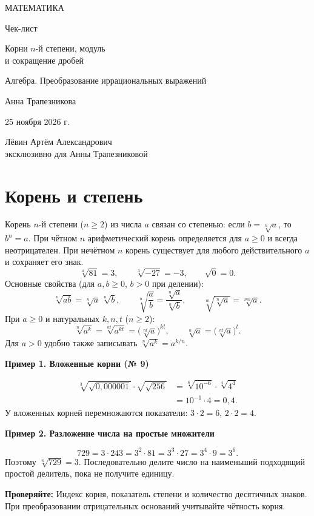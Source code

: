 \documentclass[a4paper,12pt]{article}
\newcommand{\example}[1]{\par\medskip\textcolor{darkaccent}{\textbf{#1}}\par}
\newcommand{\remember}[1]{\par\smallskip\textcolor{darkaccent}{\textbf{Проверяйте:}} #1\par}
\begin{document}
\begin{titlepage}
\centering
\vspace*{23mm}
{\Large\color{darkaccent} МАТЕМАТИКА\par}
\vspace{15mm}
{\huge Чек-лист\par}
\vspace{9mm}
{\LARGE\color{accent} Корни $n$-й степени, модуль\\[2mm] и сокращение дробей\par}
\vspace{13mm}
{\large Алгебра. Преобразование иррациональных выражений\par}
\vfill
{\large Анна Трапезникова\par}
\vspace{9mm}
{25 ноября 2026 г.\par}
\vspace{15mm}
{\small Лёвин Артём Александрович\\ эксклюзивно для Анны Трапезниковой\par}
\vspace{19mm}
\end{titlepage}
\setcounter{page}{1}
\section{Корень и степень}
Корень $n$-й степени ($n\ge2$) из числа $a$ связан со степенью: если $b=\sqrt[n]{a}$, то $b^n=a$. При чётном $n$ арифметический корень определяется для $a\ge0$ и всегда неотрицателен. При нечётном $n$ корень существует для любого действительного $a$ и сохраняет его знак.
\[
\sqrt[4]{81}=3,\qquad \sqrt[3]{-27}=-3,\qquad \sqrt{0}=0.
\]
\textcolor{darkaccent}{Основные свойства} (для $a,b\ge0$, $b>0$ при делении):
\[
\sqrt[n]{ab}=\sqrt[n]{a}\,\sqrt[n]{b},\qquad
\sqrt[n]{\frac ab}=\frac{\sqrt[n]{a}}{\sqrt[n]{b}},
\qquad \sqrt[m]{\sqrt[n]{a}}=\sqrt[mn]{a}.
\]
При $a\ge0$ и натуральных $k,n,t$ ($n\ge2$):
\[
\sqrt[n]{a^k}=\sqrt[nt]{a^{kt}}=\bigl(\sqrt[nt]{a}\bigr)^{kt},\qquad
\sqrt[n]{a}=\bigl(\sqrt[nt]{a}\bigr)^t.
\]
Для $a>0$ удобно также записывать $\sqrt[n]{a^k}=a^{k/n}$.
\example{Пример 1. Вложенные корни (№ 9)}
\[
\begin{aligned}
\sqrt[3]{\sqrt{0{,}000001}}\cdot\sqrt{\sqrt{256}}
&=\sqrt[6]{10^{-6}}\cdot\sqrt[4]{4^4}\\
&=10^{-1}\cdot4=0{,}4.
\end{aligned}
\]
У вложенных корней перемножаются показатели: $3\cdot2=6$, $2\cdot2=4$.
\example{Пример 2. Разложение числа на простые множители}
\[
729=3\cdot243=3^2\cdot81=3^3\cdot27=3^4\cdot9=3^6.
\]
Поэтому $\sqrt[6]{729}=3$. Последовательно делите число на наименьший подходящий простой делитель, пока не получите единицу.
\remember{Индекс корня, показатель степени и количество десятичных знаков. При преобразовании отрицательных оснований учитывайте чётность корня.}
\clearpage
\end{document}
